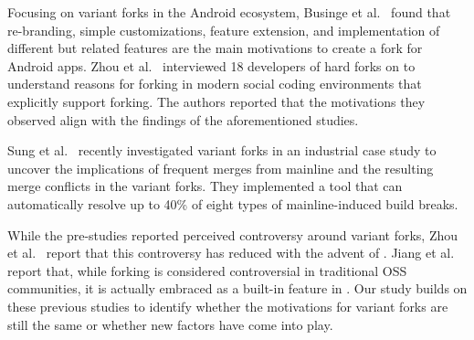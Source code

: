 
Focusing on variant forks in the Android ecosystem, Businge et al.~\cite{businge2018appfamilies} found that re-branding, simple customizations, feature extension, and implementation of different but related features are the main motivations to create a fork for Android apps.
Zhou et al.~\cite{Zhou:2020} interviewed 18 developers of hard forks on \gh to understand reasons for forking in modern social coding environments that explicitly support forking. The authors reported that the motivations they observed align with the findings of the aforementioned studies.

Sung et al.~\cite{sung:ICSE:2020} recently investigated variant forks in an industrial case study to uncover the implications of frequent merges from mainline and the resulting merge conflicts in the variant forks. They implemented a tool that can automatically resolve up to 40\% of eight types of mainline-induced build breaks.

While the pre-\gh studies reported
perceived controversy
around variant forks, Zhou et al.~\cite{Zhou:2020} report that this controversy has reduced with the advent of \gh. Jiang et al.~\cite{Lo:2017} report that, while forking is considered controversial in traditional OSS communities, it is actually embraced as a built-in feature in \gh.
Our study builds on these previous studies to identify whether the motivations for variant forks are still the same or whether new factors have come into play.  

